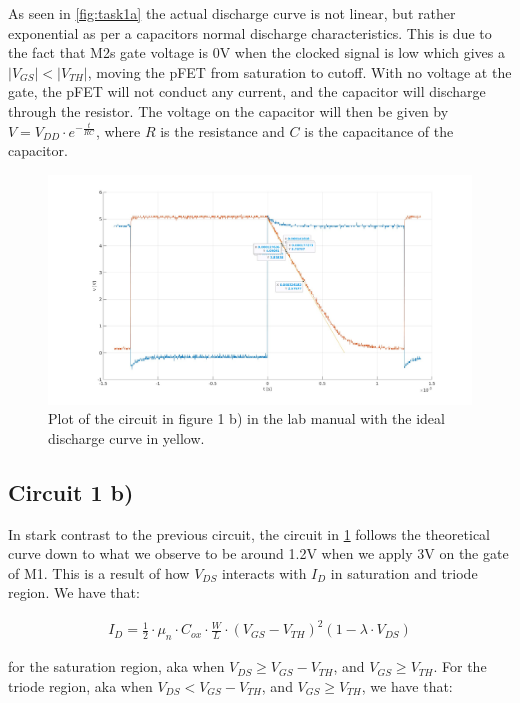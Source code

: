 \documentclass[onecolumn]{article}
\begin{document}
As seen in \ref{fig:task1a} the actual discharge curve is not linear, but rather exponential as per a capacitors normal discharge characteristics. This is due to the fact that M2s gate voltage is 0V when the clocked signal is low which gives a $|V_{GS}| < |V_{TH}|$, moving the pFET from saturation to cutoff. With no voltage at the gate, the pFET will not conduct any current, and the capacitor will discharge through the resistor. The voltage on the capacitor will then be given by $V = V_{DD} \cdot e^{-\frac{t}{RC}}$, where $R$ is the resistance and $C$ is the capacitance of the capacitor.


\clearpage

\begin{figure}[h!]
    \centering
    \includegraphics[width=1\textwidth]{1ba.jpg}
    \caption{Plot of the circuit in figure 1 b) in the lab manual with the ideal discharge curve in yellow.}
    \label{fig:task1b}
\end{figure}


\subsection{Circuit 1 b)}
In stark contrast to the previous circuit, the circuit in \ref{fig:task1b} follows the theoretical curve down to what we observe to be around 1.2V when we apply 3V on the gate of M1. This is a result of how $V_{DS}$ interacts with $I_D$ in saturation and triode region. We have that:

\begin{align}
    I_D = \frac{1}{2} \cdot \mu_n \cdot C_{ox} \cdot \frac{W}{L} \cdot (V_{GS} - V_{TH})^2(1 - \lambda \cdot V_{DS})
\end{align}

for the saturation region, aka when $V_{DS} \geq V_{GS} - V_{TH}$, and $V_{GS} \geq V_{TH}$. For the triode region, aka when $V_{DS} < V_{GS} - V_{TH}$, and $V_{GS} \geq V_{TH}$, we have that:
\end{document}
